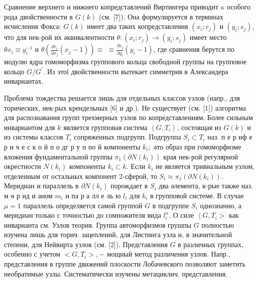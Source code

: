 \documentclass[10pt]{article}
\begin{document}
Сравнение верхнего и нижнего копредставлений Виртингера приводит $\kappa$ особого рода двойственности в $G(k)$ (см. [7]). Она формулируется в терминах исчисления Фокса: $G(k)$ имеет два таких копредставления $\left(x_{i} ; r_{j}\right)$ и $\left(y_{i} ; s_{j}\right)$, что для нек-рой их әквивалентности $\theta:\left(x_{i} ; r_{j}\right) \rightarrow\left(y_{i} ; s_{j}\right)$ имеет место $\theta x_{i} \equiv y_{i}^{-1}$ и $\theta\left(\frac{\partial r_{i}}{\partial x_{j}}\left(x_{j}-1\right)\right) \equiv$ $\equiv \frac{\partial s_{j}}{\partial y_{i}}\left(y_{i}-1\right)$, где сравнения берутся по модулю ядра гомоморфизма группового кольца свободной группы на групповое кольцо $G / G^{\prime}$. Из этої двойственности вытекает симметрия в Александера инвариантах.



Проблема тождества решается лишь для отдельных классов узлов (напр., для торических, нек-рых крендельных [6] и др.). Не существует (см. [1]) алгоритма для распознавания групп трехмерных узлов по копредставлениям. Более сильным инвариантом для $k$ является групповая система $\left\langle G, T_{i}\right\rangle$, состоящая из $G(k)$ и из системы классов $T_{i}$ сопряженных подгрупп. Подгруппа $S_{i} \subset T_{i}$ наз. п е р иф е р и ч е с к о й п о дг р у п по й компоненты $k_{i} ;$ әто образ при гомоморфизме вложения фундаментальной группы $\pi_{1}\left(\partial N\left(k_{i}\right)\right)$ края нек-рой регулярной окрестности $N\left(k_{i}\right)$ компоненты $k_{i} \subset k$. Если $k_{i}$ не является тривиальным узлом, отделенным от остальных компонент 2-сферой, то $S_{i} \approx \pi_{1}\left(\partial N\left(k_{i}\right)\right)$. Меридиан и параллель в $\partial N\left(k_{i}\right)$ порождает в $S_{i}$ два әлемента, к-рые также наз. м ө р ид и аном $m_{i}$ и па р а лл е ль ю $l_{i}$ для $k_{i}$ в групповой системе. В случае $\mu=1$ параллель определяется самой группой $G$ в подгруппе $S_{i}$ однозначно, а меридиан только с точностью до сомножителя вида $l_{i}^{n}$. О силе $\left\langle G, T_{i}>\right.$ как инварианта см. Узлов теория. Группа автоморфизмов грушпы $G$ полностью изучена лишь для торич. зацеплений, для Листинга узла и, в значительной степени, для Нейвирта узлов (см. [2]). Представления $G$ в различных группах, особенно с учетом $<G, T_{i}>,-$ мощный метод различения узлов. Напр., представления в группе движений плоскости Лобачевского позволяют заметить необратимые узлы. Систематически изучены метациклич. представления.
\end{document}
